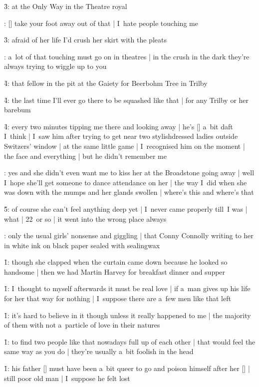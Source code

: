 \f3:
at the Only Way in the Theatre royal

:
[\milly] take your foot away out of that |
I~hate people touching me

\f3:
afraid of her life I'd crush her skirt with the pleats

:
a~lot of that touching must go on in theatres |
in the crush
in the dark they're always trying to wiggle up to you

\f4:
that fellow in the pit at the Gaiety for Beerbohm Tree in Trilby

\f4:
the last time I'll ever go there to be squashed like that |
for any Trilby or her barebum

\f4:
every two minutes tipping me there and looking away |
he's [\pitman] a~bit daft I~think |
I~saw him after trying to get near two stylishdressed ladies outside Switzers' window |
at the same little game |
I~recognised him on the moment |
the face and everything |
but he didn't remember me

:
yes and she didn't even want me to kiss her at the Broadstone going away |
well I~hope she'll get someone to dance attendance on her |
the way I~did when she was down with the mumps and her glands swollen |
where's this and where's that

\f5:
of course she can't feel anything deep yet |
I~never came properly till~I was |
what |
22~or so |
it went into the wrong place always

:
only the usual girls' nonsense and giggling |
that Conny Connolly writing to her in white ink on black paper sealed with sealingwax

\f1:
though she clapped when the curtain came down because he looked so handsome |
then we had Martin Harvey for breakfast dinner and supper

\f1:
I~thought to myself afterwards it must be real love |
if a~man gives up his life for her that way for nothing |
I~suppose there are a~few men like that left

\f1:
it's hard to believe in it though unless it really happened to me |
the majority of them with not a~particle of love in their natures

\f1:
to find two people like that nowadays full up of each other |
that would feel the same way as you do |
they're usually a~bit foolish in the head

\f1:
his father [\bloomDa] must have been a~bit queer
to go and poison himself after her [\bloomMa] |
still poor old man |
I~suppose he felt lost


